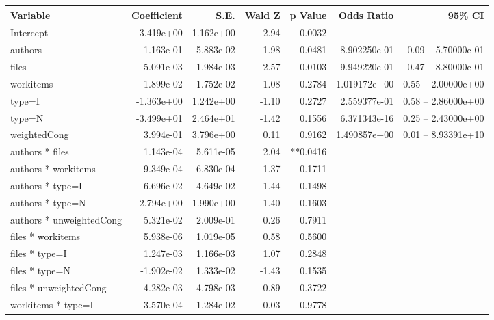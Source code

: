 \begin{table*}
\begin{center}
\begin{tabular}{lrrrrrr}
Variable & Coefficient & S.E. & Wald Z & p Value & Odds Ratio & 95\% CI \\
	\hline
Intercept                  &  3.419e+00 & 1.162e+00 &  2.94  & 0.0032 & - & - \\
authors                    & -1.163e-01 & 5.883e-02 & -1.98  & 0.0481 & 8.902250e-01 &  0.09 -- 5.70000e-01 \\
files                      & -5.091e-03 & 1.984e-03 & -2.57  & 0.0103 & 9.949220e-01 &  0.47 -- 8.80000e-01 \\
workitems                  &  1.899e-02 & 1.752e-02 &  1.08  & 0.2784 & 1.019172e+00 &  0.55 -- 2.00000e+00 \\
type=I                     & -1.363e+00 & 1.242e+00 & -1.10  & 0.2727 & 2.559377e-01 &  0.58 -- 2.86000e+00 \\
type=N                     & -3.499e+01 & 2.464e+01 & -1.42  & 0.1556 & 6.371343e-16 &  0.25 -- 2.43000e+00 \\
weightedCong               &  3.994e-01 & 3.796e+00 &  0.11  & 0.9162 & 1.490857e+00 &  0.01 -- 8.93391e+10 \\
	\hline
authors * files            &  1.143e-04 & 5.611e-05 &  2.04  & **0.0416 &              &  \\
authors * workitems        & -9.349e-04 & 6.830e-04 & -1.37  & 0.1711 &              &  \\
authors * type=I           &  6.696e-02 & 4.649e-02 &  1.44  & 0.1498 &              &  \\
authors * type=N           &  2.794e+00 & 1.990e+00 &  1.40  & 0.1603 &              &  \\
authors * unweightedCong   &  5.321e-02 & 2.009e-01 &  0.26  & 0.7911 &              &  \\
files * workitems          &  5.938e-06 & 1.019e-05 &  0.58  & 0.5600 &              &  \\
files * type=I             &  1.247e-03 & 1.166e-03 &  1.07  & 0.2848 &              &  \\
files * type=N             & -1.902e-02 & 1.333e-02 & -1.43  & 0.1535 &              &  \\
files * unweightedCong     &  4.282e-03 & 4.798e-03 &  0.89  & 0.3722 &              &  \\
workitems * type=I         & -3.570e-04 & 1.284e-02 & -0.03  & 0.9778 &              &  \\

\end{tabular}
\end{center}
\end{table*}
